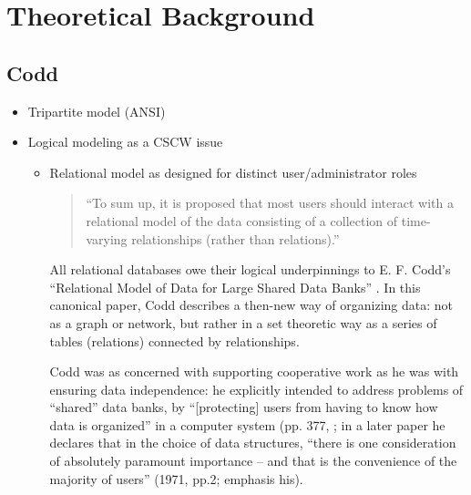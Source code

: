 \section{Theoretical Background}

\subsection{Codd}
\begin{itemize}
\item Tripartite model (ANSI)
\item Logical modeling as a CSCW issue
\begin{itemize}
\item Relational model as designed for distinct user/administrator roles

\begin{quote}
“To sum up, it is proposed that most users should interact with a relational model of the data consisting of a collection of time-varying relationships (rather than relations).”
\end{quote}

All relational databases owe their logical underpinnings to E. F. Codd’s “Relational Model of Data for Large Shared Data Banks” \cite{Codd_1970}. In this canonical paper, Codd describes a then-new way of organizing data: not as a graph or network, but rather in a set theoretic way as a series of tables (relations) connected by relationships.  

Codd was as concerned with supporting cooperative work as he was with ensuring data independence: he explicitly intended to address problems of “shared” data banks, by  “[protecting] users from having to know how data is organized” in a computer system (pp. 377, \cite{Codd_1970}; in a later paper he declares that in the choice of data structures,  “there is one consideration of absolutely paramount importance – and that is the convenience of the majority of users” (1971, pp.2; emphasis his). 


\end{itemize}
\end{itemize}
